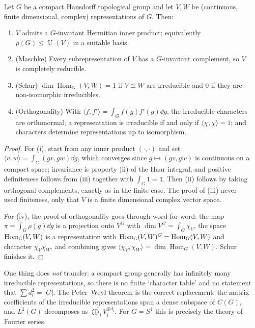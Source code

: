 \documentclass[a4paper]{scrartcl}
\newcommand{\U}{\operatorname{U}}
\newcommand{\Hom}{\operatorname{Hom}}
\newcommand{\ip}[2]{\langle #1, #2 \rangle}
\begin{document}
\begin{theorem}
	Let $G$ be a compact Hausdorff topological group and let $V, W$ be (continuous, finite dimensional, complex) representations of $G$. Then:
	\begin{enumerate}[label=(\roman*)]
		\item $V$ admits a $G$-invariant Hermitian inner product; equivalently $\rho(G)\leq\U(V)$ in a suitable basis.
		\item (Maschke) Every subrepresentation of $V$ has a $G$-invariant complement, so $V$ is completely reducible.
		\item (Schur) $\dim\Hom_G(V,W) = 1$ if $V\cong W$ are irreducible and $0$ if they are non-isomorphic irreducibles.
		\item (Orthogonality) With $\ip{f}{f'} = \int_G\overline{f(g)}f'(g)\dd g$, the irreducible characters are orthonormal; a representation is irreducible if and only if $\ip{\chi}{\chi} = 1$; and characters determine representations up to isomorphism.
	\end{enumerate}
\end{theorem}
\begin{proof}
	For (i), start from any inner product $(\cdot,\cdot)$ and set $\ip vw = \int_G(gv,gw)\dd g$, which converges since $g\mapsto (gv,gw)$ is continuous on a compact space; invariance is property (ii) of the Haar integral, and positive definiteness follows from (iii) together with $\int_G1 = 1$. Then (ii) follows by taking orthogonal complements, exactly as in the finite case. The proof of (iii) never used finiteness, only that $V$ is a finite dimensional complex vector space.

	For (iv), the proof of orthogonality goes through word for word: the map $\pi = \int_G\rho(g)\dd g$ is a projection onto $V^G$ with $\dim V^G = \int_G\chi_V$, the space $\Hom_\C(V,W)$ is a representation with $\Hom_\C(V,W)^G = \Hom_G(V,W)$ and character $\overline{\chi_V}\chi_W$, and combining gives $\ip{\chi_V}{\chi_W} = \dim\Hom_G(V,W)$. Schur finishes it.
\end{proof}

\begin{remark}
	One thing does \emph{not} transfer: a compact group generally has infinitely many irreducible representations, so there is no finite `character table' and no statement that $\sum d_i^2 = |G|$. The Peter--Weyl theorem is the correct replacement: the matrix coefficients of the irreducible representations span a dense subspace of $C(G)$, and $L^2(G)$ decomposes as $\widehat\bigoplus_i V_i^{\oplus d_i}$. For $G = S^1$ this is precisely the theory of Fourier series.
\end{remark}
\end{document}
